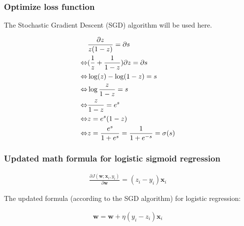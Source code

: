 \subsubsection{Optimize loss function}
The Stochastic Gradient Descent (SGD) algorithm will be used here.

\begin{align}
    & \frac{\partial z}{z(1-z)} = \partial s \\ 
	\Leftrightarrow & (\frac{1}{z} + \frac{1}{1 - z})\partial z = \partial s \notag \\  
	\Leftrightarrow & \log(z) - \log(1 - z) = s \notag \\ 
	\Leftrightarrow & \log \frac{z}{1 - z} = s \notag \\
	\Leftrightarrow & \frac{z}{1 - z} = e^s \notag \\
	\Leftrightarrow & z = e^s (1 - z) \notag \\
	\Leftrightarrow & z = \frac{e^s}{1 +e^s} = \frac{1}{1 + e^{-s}} = \sigma(s) \notag 
\end{align}

\subsubsection{Updated math formula for logistic sigmoid regression}
\begin{align}
    \frac{\partial J(\mathbf{w}; \mathbf{x}_i, y_i)}{\partial \mathbf{w}} = (z_i - y_i)\mathbf{x}_i
\end{align}
    
The updated formula (according to the SGD algorithm) for logistic regression:

\begin{align}
    \mathbf{w} = \mathbf{w} + \eta(y_i - z_i)\mathbf{x}_i
\end{align}

